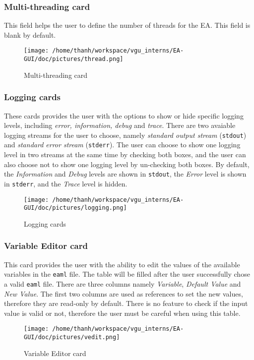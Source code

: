 \documentclass[11pt,a4paper]{article}
\begin{document}
\subsubsection{Multi-threading card}
This field helps the user to define the number of threads for the EA. This field is blank by default.
\begin{figure}[htp]
\centering
\texttt{[image: /home/thanh/workspace/vgu\_interns/EA-GUI/doc/pictures/thread.png]}
\caption{Multi-threading card}
\label{}
\end{figure}

\subsubsection{Logging cards}
These cards provides the user with the options to show or hide specific logging levels, including \textit{error, information, debug} and \textit{trace}. There are two avaiable logging streams for the user to choose, namely \textit{standard output stream} (\texttt{stdout}) and \textit{standard error stream} (\texttt{stderr}). The user can choose to show one logging level in two streams at the same time by checking both boxes, and the user can also choose not to show one logging level by un-checking both boxes. By default, the \textit{Information} and \textit{Debug} levels are shown in \texttt{stdout}, the \textit{Error} level is shown in \texttt{stderr}, and the \textit{Trace} level is hidden.
\begin{figure}[htp]
\centering
\texttt{[image: /home/thanh/workspace/vgu\_interns/EA-GUI/doc/pictures/logging.png]}
\caption{Logging cards}
\label{}
\end{figure}

\subsubsection{Variable Editor card}
This card provides the user with the ability to edit the values of the available variables in the \texttt{eaml} file. The table will be filled after the user successfully chose a valid \texttt{eaml} file. There are three columns namely \textit{Variable}, \textit{Default Value} and \textit{New Value}. The first two columns are used as references to set the new values, therefore they are read-only by default. There is no feature to check if the input value is valid or not, therefore the user must be careful when using this table.
\begin{figure}[htp]
\centering
\texttt{[image: /home/thanh/workspace/vgu\_interns/EA-GUI/doc/pictures/vedit.png]}
\caption{Variable Editor card}
\label{}
\end{figure}
\end{document}
